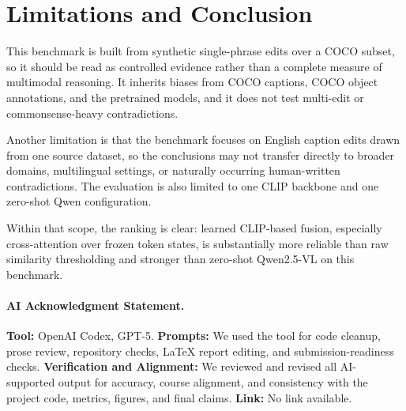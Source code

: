 \documentclass[10pt,twocolumn,letterpaper]{article}
\begin{document}
\section{Limitations and Conclusion}
\noindent
This benchmark is built from synthetic single-phrase edits over a COCO subset, so it should be read as controlled evidence rather than a complete measure of multimodal reasoning. It inherits biases from COCO captions, COCO object annotations, and the pretrained models, and it does not test multi-edit or commonsense-heavy contradictions.

Another limitation is that the benchmark focuses on English caption edits drawn from one source dataset, so the conclusions may not transfer directly to broader domains, multilingual settings, or naturally occurring human-written contradictions. The evaluation is also limited to one CLIP backbone and one zero-shot Qwen configuration.

Within that scope, the ranking is clear: learned CLIP-based fusion, especially cross-attention over frozen token states, is substantially more reliable than raw similarity thresholding and stronger than zero-shot Qwen2.5-VL on this benchmark.

\paragraph{AI Acknowledgment Statement.}
\textbf{Tool:} OpenAI Codex, GPT-5. \textbf{Prompts:} We used the tool for code cleanup, prose review, repository checks, LaTeX report editing, and submission-readiness checks. \textbf{Verification and Alignment:} We reviewed and revised all AI-supported output for accuracy, course alignment, and consistency with the project code, metrics, figures, and final claims. \textbf{Link:} No link available.
\end{document}
